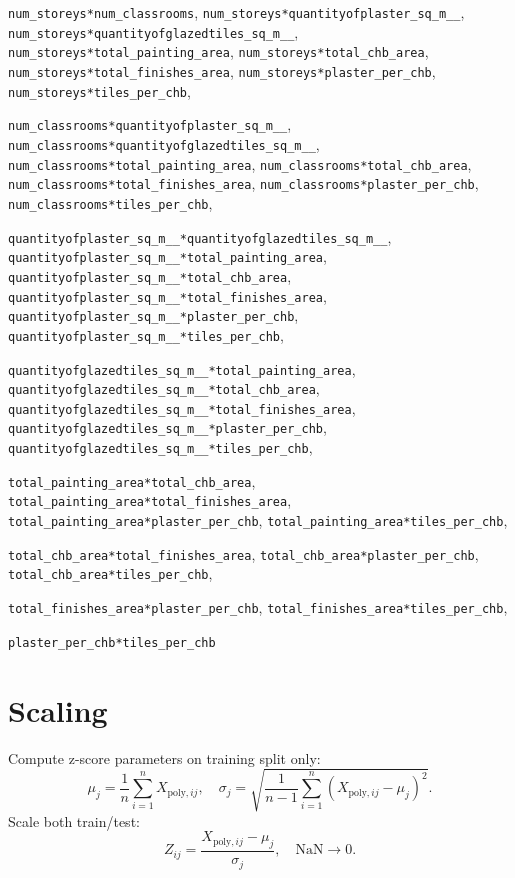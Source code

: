 \documentclass[11pt]{article}
\begin{document}
\verb|num_storeys*num_classrooms|, \verb|num_storeys*quantityofplaster_sq_m__|, \verb|num_storeys*quantityofglazedtiles_sq_m__|, \verb|num_storeys*total_painting_area|, \verb|num_storeys*total_chb_area|, \verb|num_storeys*total_finishes_area|, \verb|num_storeys*plaster_per_chb|, \verb|num_storeys*tiles_per_chb|,

\verb|num_classrooms*quantityofplaster_sq_m__|, \verb|num_classrooms*quantityofglazedtiles_sq_m__|, \verb|num_classrooms*total_painting_area|, \verb|num_classrooms*total_chb_area|, \verb|num_classrooms*total_finishes_area|, \verb|num_classrooms*plaster_per_chb|, \verb|num_classrooms*tiles_per_chb|,

\verb|quantityofplaster_sq_m__*quantityofglazedtiles_sq_m__|, \verb|quantityofplaster_sq_m__*total_painting_area|, \verb|quantityofplaster_sq_m__*total_chb_area|, \verb|quantityofplaster_sq_m__*total_finishes_area|, \verb|quantityofplaster_sq_m__*plaster_per_chb|, \verb|quantityofplaster_sq_m__*tiles_per_chb|,

\verb|quantityofglazedtiles_sq_m__*total_painting_area|, \verb|quantityofglazedtiles_sq_m__*total_chb_area|, \verb|quantityofglazedtiles_sq_m__*total_finishes_area|, \verb|quantityofglazedtiles_sq_m__*plaster_per_chb|, \verb|quantityofglazedtiles_sq_m__*tiles_per_chb|,

\verb|total_painting_area*total_chb_area|, \verb|total_painting_area*total_finishes_area|, \verb|total_painting_area*plaster_per_chb|, \verb|total_painting_area*tiles_per_chb|,

\verb|total_chb_area*total_finishes_area|, \verb|total_chb_area*plaster_per_chb|, \verb|total_chb_area*tiles_per_chb|,

\verb|total_finishes_area*plaster_per_chb|, \verb|total_finishes_area*tiles_per_chb|,

\verb|plaster_per_chb*tiles_per_chb|

\normalsize

\section*{Scaling}
Compute z-score parameters on training split only:
\[
\mu_j = \frac{1}{n}\sum_{i=1}^n X_{\text{poly},ij},\quad
\sigma_j = \sqrt{\frac{1}{n-1}\sum_{i=1}^n (X_{\text{poly},ij}-\mu_j)^2}.
\]
Scale both train/test:
\[
Z_{ij} = \frac{X_{\text{poly},ij}-\mu_j}{\sigma_j},\quad \text{NaN}\rightarrow 0.
\]
\end{document}
